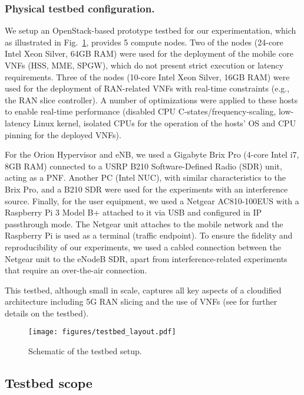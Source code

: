 \documentclass[journal,comsoc]{IEEEtran}
\begin{document}
% 
\subsubsection{Physical testbed configuration.}
We setup an OpenStack-based prototype testbed for our experimentation, which as illustrated in Fig.~\ref{fig:openstack_testbed}, provides 5 compute nodes. 
Two of the nodes (24-core Intel Xeon Silver, 64GB RAM) were used for the deployment of the mobile core VNFs (HSS, MME, SPGW), which do not present strict execution or latency requirements. Three of the nodes (10-core Intel Xeon Silver, 16GB RAM) were used for the deployment of RAN-related VNFs with real-time constraints (e.g., the RAN slice controller). 
A number of optimizations were applied to these hosts to enable real-time performance (disabled CPU C-states/frequency-scaling, low-latency Linux kernel, isolated CPUs for the operation of the hosts' OS and CPU pinning for the deployed VNFs).

For the Orion Hypervisor and eNB, we used a Gigabyte Brix Pro (4-core Intel i7, 8GB RAM) connected to a USRP B210 Software-Defined Radio (SDR) unit, acting as a PNF. 
Another PC (Intel NUC), with similar characteristics to the Brix Pro, and a B210 SDR were used for the experiments with an interference source. Finally, for the user equipment, we used a Netgear AC810-100EUS with a Raspberry Pi 3 Model B+ attached to it via USB and configured in IP passthrough mode. The Netgear unit attaches to the mobile network and the Raspberry Pi is used as a terminal (traffic endpoint). To ensure the fidelity and reproducibility of our experiments, we used a cabled connection between the Netgear unit to the eNodeB SDR, apart from interference-related experiments that require an over-the-air connection.

This testbed, although small in scale, captures all key aspects of a cloudified architecture including 5G RAN slicing and the use of VNFs (see \cite{foukas2018testbed} for further details on the testbed). 

% 
\begin{figure}[t]
	\centering
	\texttt{[image: figures/testbed\_layout.pdf]}
	\vspace{-5mm}
	\caption{Schematic of the testbed setup.}
	\label{fig:openstack_testbed}
\end{figure}

\subsection{Testbed scope}
\end{document}
